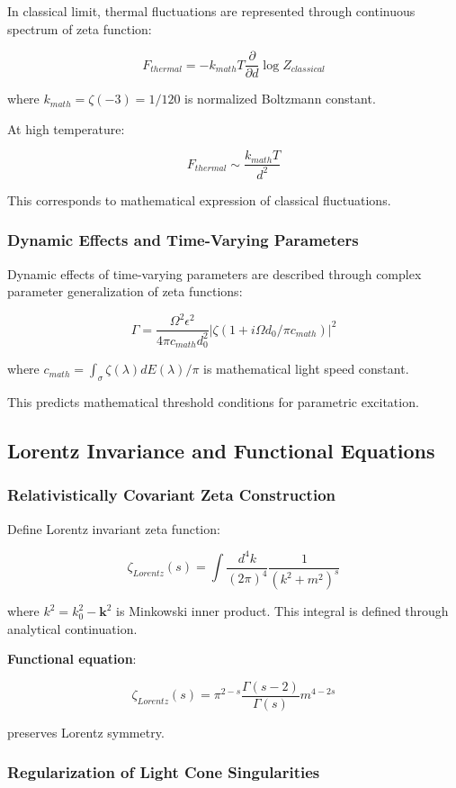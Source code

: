 \documentclass[12pt,a4paper]{article}
\begin{document}
In classical limit, thermal fluctuations are represented through continuous spectrum of zeta function:

$$F_{thermal} = -k_{math} T \frac{\partial}{\partial d} \log Z_{classical}$$

where $k_{math} = \zeta(-3) = 1/120$ is normalized Boltzmann constant.

At high temperature:

$$F_{thermal} \sim \frac{k_{math} T}{d^2}$$

This corresponds to mathematical expression of classical fluctuations.

\subsubsection{Dynamic Effects and Time-Varying Parameters}

Dynamic effects of time-varying parameters are described through complex parameter generalization of zeta functions:

$$\Gamma = \frac{\Omega^2 \epsilon^2}{4\pi c_{math} d_0^2} |\zeta(1 + i\Omega d_0/\pi c_{math})|^2$$

where $c_{math} = \int_{\sigma} \zeta(\lambda) dE(\lambda) / \pi$ is mathematical light speed constant.

This predicts mathematical threshold conditions for parametric excitation.

\subsection{Lorentz Invariance and Functional Equations}

\subsubsection{Relativistically Covariant Zeta Construction}

Define Lorentz invariant zeta function:

$$\zeta_{Lorentz}(s) = \int \frac{d^4k}{(2\pi)^4} \frac{1}{(k^2 + m^2)^s}$$

where $k^2 = k_0^2 - \mathbf{k}^2$ is Minkowski inner product. This integral is defined through analytical continuation.

\textbf{Functional equation}:

$$\zeta_{Lorentz}(s) = \pi^{2-s} \frac{\Gamma(s-2)}{\Gamma(s)} m^{4-2s}$$

preserves Lorentz symmetry.

\subsubsection{Regularization of Light Cone Singularities}
\end{document}
